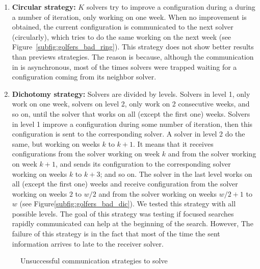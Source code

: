 \begin{enumerate}[label=\Alph*]
\item \textbf{Circular strategy:} $K$ solvers try to improve a configuration during a during a number of iteration, only working on one week. When no improvement is obtained, the current configuration is communicated to the next solver (circularly), which tries to do the same working on the next week (see Figure~\ref{subfig:golfers_bad_ring}).
\subitem This strategy does not show better results than previews strategies. The reason is because, although the communication in \posl{} is asynchronous, most of the times solvers were trapped waiting for a configuration coming from its neighbor solver.

\item \textbf{Dichotomy strategy:} Solvers are divided by levels. Solvers in level 1, only work on one week, solvers on level 2, only work on 2 consecutive weeks, and so on, until the solver that works on all (except the first one) weeks. Solvers in level 1 improve a configuration during some number of iteration, then this configuration is sent to the corresponding solver. A solver in level 2 do the same, but working on weeks $k$ to $k+1$. It means that it receives configurations from the solver working on week $k$ and from the solver working on week $k+1$, and sends its configuration to the corresponding solver working on weeks $k$ to $k+3$; and so on. The solver in the last level works on all (except the first one) weeks and receive configuration from the solver working on weeks $2$ to $w/2$ and from the solver working on weeks $w/2+1$ to $w$ (see Figure\ref{subfig:golfers_bad_dic}). We tested this strategy with all possible levels. 
\subitem The goal of this strategy was testing if focused searches rapidly communicated can help at the beginning of the search. However, The failure of this strategy is in the fact that most of the time the sent information arrives to late to the receiver solver.
\end{enumerate}

\begin{figure}[h]
	\centering
	\caption[]{Unsuccessful communication strategies to solve \SGP}
	\label{fig:golfers_bad}
\end{figure}


